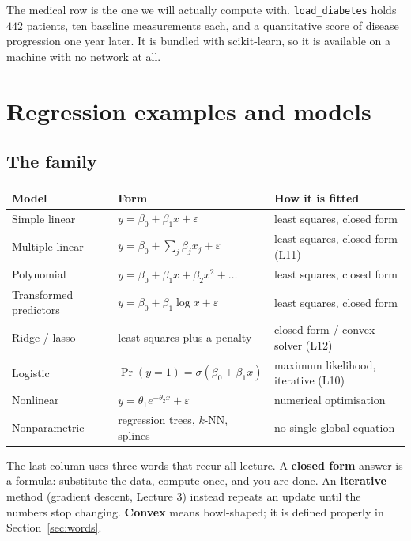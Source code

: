 \documentclass[11pt]{article}
\begin{document}
The medical row is the one we will actually compute with.
\texttt{load\_diabetes} holds $442$ patients, ten baseline measurements each,
and a quantitative score of disease progression one year later. It is bundled
with scikit-learn, so it is available on a machine with no network at all.

\section{Regression examples and models}
\label{sec:models}

\subsection{The family}

\begin{center}\small
\begin{tabular}{@{}lll@{}}
  \toprule
  \textbf{Model} & \textbf{Form} & \textbf{How it is fitted}\\
  \midrule
  Simple linear & $y = \beta_0 + \beta_1x + \varepsilon$ &
    least squares, closed form\\
  Multiple linear & $y = \beta_0 + \sum_j\beta_jx_j + \varepsilon$ &
    least squares, closed form (L11)\\
  Polynomial & $y = \beta_0+\beta_1x+\beta_2x^2+\dots$ &
    least squares, closed form\\
  Transformed predictors & $y = \beta_0 + \beta_1\log x + \varepsilon$ &
    least squares, closed form\\
  \midrule
  Ridge / lasso & least squares plus a penalty &
    closed form / convex solver (L12)\\
  Logistic & $\Pr(y=1)=\sigma(\beta_0+\beta_1x)$ &
    maximum likelihood, iterative (L10)\\
  Nonlinear & $y = \theta_1e^{-\theta_2x}+\varepsilon$ &
    numerical optimisation\\
  Nonparametric & regression trees, $k$-NN, splines &
    no single global equation\\
  \bottomrule
\end{tabular}
\end{center}

The last column uses three words that recur all lecture. A \textbf{closed
form} answer is a formula: substitute the data, compute once, and you are
done. An \textbf{iterative} method (gradient descent, Lecture 3) instead
repeats an update until the numbers stop changing. \textbf{Convex} means
bowl-shaped; it is defined properly in Section~\ref{sec:words}.
\end{document}
